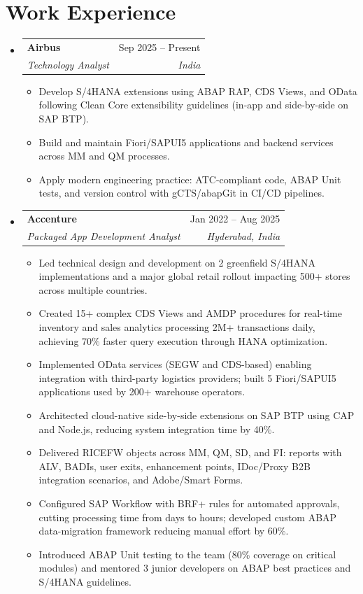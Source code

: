 \documentclass[letterpaper,11pt]{article}
\makeatletter
\newcommand{\resumeItem}[1]{
  \item\small{
    {#1 \vspace{-2pt}}
  }
}
\newcommand{\resumeSubheading}[4]{
  \vspace{-2pt}\item
    \begin{tabular*}{0.97\textwidth}[t]{l@{\extracolsep{\fill}}r}
      \textbf{#1} & #2 \\
      \textit{\small#3} & \textit{\small #4} \\
    \end{tabular*}\vspace{-7pt}
}
\newcommand{\resumeSubHeadingListStart}{\begin{itemize}[leftmargin=0.15in, label={}]}
\newcommand{\resumeSubHeadingListEnd}{\end{itemize}}
\newcommand{\resumeItemListStart}{\begin{itemize}}
\newcommand{\resumeItemListEnd}{\end{itemize}\vspace{-5pt}}
\makeatother
\begin{document}
\section{Work Experience}
  \resumeSubHeadingListStart

    \resumeSubheading
      {Airbus}{Sep 2025 -- Present}
      {Technology Analyst}{India}
      \resumeItemListStart
        \resumeItem{Develop S/4HANA extensions using ABAP RAP, CDS Views, and OData following Clean Core extensibility guidelines (in-app and side-by-side on SAP BTP).}
        \resumeItem{Build and maintain Fiori/SAPUI5 applications and backend services across MM and QM processes.}
        \resumeItem{Apply modern engineering practice: ATC-compliant code, ABAP Unit tests, and version control with gCTS/abapGit in CI/CD pipelines.}
      \resumeItemListEnd

    \resumeSubheading
      {Accenture}{Jan 2022 -- Aug 2025}
      {Packaged App Development Analyst}{Hyderabad, India}
      \resumeItemListStart
        \resumeItem{Led technical design and development on 2 greenfield S/4HANA implementations and a major global retail rollout impacting 500+ stores across multiple countries.}
        \resumeItem{Created 15+ complex CDS Views and AMDP procedures for real-time inventory and sales analytics processing 2M+ transactions daily, achieving 70\% faster query execution through HANA optimization.}
        \resumeItem{Implemented OData services (SEGW and CDS-based) enabling integration with third-party logistics providers; built 5 Fiori/SAPUI5 applications used by 200+ warehouse operators.}
        \resumeItem{Architected cloud-native side-by-side extensions on SAP BTP using CAP and Node.js, reducing system integration time by 40\%.}
        \resumeItem{Delivered RICEFW objects across MM, QM, SD, and FI: reports with ALV, BADIs, user exits, enhancement points, IDoc/Proxy B2B integration scenarios, and Adobe/Smart Forms.}
        \resumeItem{Configured SAP Workflow with BRF+ rules for automated approvals, cutting processing time from days to hours; developed custom ABAP data-migration framework reducing manual effort by 60\%.}
        \resumeItem{Introduced ABAP Unit testing to the team (80\% coverage on critical modules) and mentored 3 junior developers on ABAP best practices and S/4HANA guidelines.}

      \resumeItemListEnd

  \resumeSubHeadingListEnd

\end{document}
